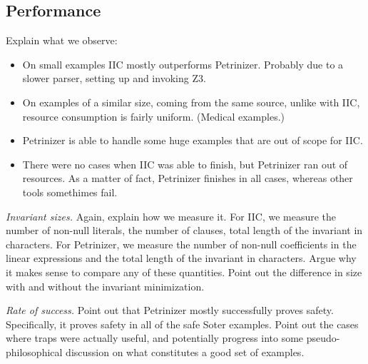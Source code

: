 \subsection{Performance}

Explain what we observe:
\begin{itemize}
  \item On small examples IIC mostly outperforms Petrinizer. Probably due
    to a slower parser, setting up and invoking Z3.
  \item On examples of a similar size, coming from the same source,
    unlike with IIC, resource consumption is fairly uniform. (Medical examples.)
  \item Petrinizer is able to handle some huge examples that are out of
    scope for IIC.
  \item There were no cases when IIC was able to finish, but Petrinizer ran
    out of resources. As a matter of fact, Petrinizer finishes in all cases,
    whereas other tools somethimes fail.
\end{itemize}

\emph{Invariant sizes.} Again, explain how we measure it. For IIC, we measure
the number of non-null literals, the number of clauses, total length of
the invariant in characters. For Petrinizer, we measure the number of
non-null coefficients in the linear expressions and the total length of the
invariant in characters. Argue why it makes sense to compare any of these
quantities. Point out the difference in size with and without the invariant
minimization.
  
\emph{Rate of success.} Point out that Petrinizer mostly successfully proves
safety. Specifically, it proves safety in all of the safe Soter examples.
Point out the cases where traps were actually useful, and potentially progress
into some pseudo-philosophical discussion on what constitutes a good set of examples.

